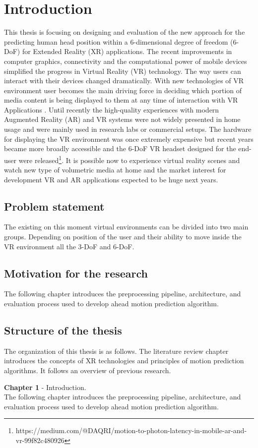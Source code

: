 \chapter{Introduction}
\label{sec:intro}
This thesis is focusing on designing and evaluation of the new approach for the predicting human head position within a 6-dimensional degree of freedom (6-DoF) for Extended Reality (XR) applications. The recent improvements in computer graphics, connectivity and the computational power of mobile devices simplified the progress in Virtual Reality (VR) technology. The way users can interact with their devices changed dramatically. With new technologies of VR environment user becomes the main driving force in deciding which portion of media content is being displayed to them at any time of interaction with VR Applications \cite{new_challenge}. Until recently the high-quality experiences with modern Augmented Reality (AR) and VR systems were not widely presented in home usage and were mainly used in research labs or commercial setups. The hardware for displaying the VR environment was once extremely expensive but recent years became more broadly accessible and the 6-DoF VR headset designed for the end-user were released\footnote{https://medium.com/@DAQRI/motion-to-photon-latency-in-mobile-ar-and-vr-99f82c480926}. It is possible now to experience virtual reality scenes and watch new type of volumetric media at home and the market interest for development VR and AR applications expected to be huge next years.


\section{Problem statement}
\label{sec:intro:problem}
The existing on this moment virtual environments can be divided into two main groups. Depending on position of the user and their ability to move inside the VR environment all the 3-DoF and 6-DoF. 

\section{Motivation for the research}
\label{sec:intro:motivation}
The following chapter introduces the preprocessing pipeline, architecture, and evaluation process used to develop ahead motion prediction algorithm.


\section{Structure of the thesis}
\label{sec:intro:structure}
The organization of this thesis is as follows. The literature review chapter introduces the concepts of XR technologies and principles of motion prediction algorithms. It follows an overview of previous research. 

\textbf{Chapter 1} - Introduction.\\
The following chapter introduces the preprocessing pipeline, architecture, and evaluation process used to develop ahead motion prediction algorithm.




